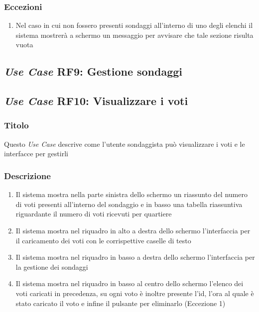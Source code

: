         \subsubsection{Eccezioni}
            \begin{enumerate}
                \item Nel caso in cui non fossero presenti sondaggi all'interno di uno degli elenchi il sistema mostrerà a schermo un messaggio per avvisare che tale sezione risulta vuota
            \end{enumerate}

    \subsection{\textit{Use Case} RF9: Gestione sondaggi}

    \subsection{\textit{Use Case} RF10: Visualizzare i voti}
        \subsubsection{Titolo}
            Questo \textit{Use Case} descrive come l'utente sondaggista può visualizzare i voti e le interfacce per gestirli
        \subsubsection{Descrizione}
            \begin{enumerate}
                \item Il sistema mostra nella parte sinistra dello schermo un riassunto del numero di voti presenti all'interno del sondaggio e in basso una tabella riassuntiva riguardante il numero di voti ricevuti per quartiere
                \item Il sistema mostra nel riquadro in alto a destra dello schermo l'interfaccia per il caricamento dei voti con le corrispettive caselle di testo
                \item Il sistema mostra nel riquadro in basso a destra dello schermo l'interfaccia per la gestione dei sondaggi
                \item Il sistema mostra nel riquadro in basso al centro dello schermo l'elenco dei voti caricati in precedenza, su ogni voto è inoltre presente l'id, l'ora al quale è stato caricato il voto e infine il pulsante per eliminarlo (Eccezione 1)
            \end{enumerate}
